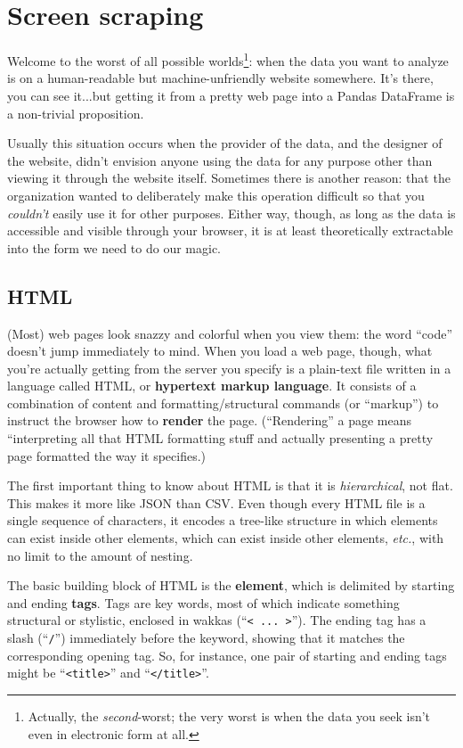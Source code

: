 
\chapter{Screen scraping}
\label{ch:screenScraping}

Welcome to the worst of all possible worlds\footnote{Actually, the
\textit{second}-worst; the very worst is when the data you seek isn't even in
electronic form at all.}: when the data you want to analyze is on a
human-readable but machine-unfriendly website somewhere. It's there, you can
see it...but getting it from a pretty web page into a Pandas DataFrame is a
non-trivial proposition.

Usually this situation occurs when the provider of the data, and the designer
of the website, didn't envision anyone using the data for any purpose other
than viewing it through the website itself. Sometimes there is another reason:
that the organization wanted to deliberately make this operation difficult so
that you \textit{couldn't} easily use it for other purposes. Either way,
though, as long as the data is accessible and visible through your browser, it
is at least theoretically extractable into the form we need to do our magic.

\section{HTML}

(Most) web pages look snazzy and colorful when you view them: the word
``code''
doesn't jump immediately to mind. When you load a web page, though, what
you're actually getting from the server you specify is a plain-text file
written in a language called HTML, or \textbf{hypertext markup language}. It
consists of a combination of content and formatting/structural commands (or
``markup'') to instruct the browser how to \textbf{render} the page.
(``Rendering'' a page means ``interpreting all that HTML formatting stuff and
actually presenting a pretty page formatted the way it specifies.)

The first important thing to know about HTML is that it is
\textit{hierarchical}, not flat. This makes it more like JSON than CSV. Even
though every HTML file is a single sequence of characters, it encodes a
tree-like structure in which elements can exist inside other elements, which
can exist inside other elements, \textit{etc.}, with no limit to the amount of
nesting.

The basic building block of HTML is the \textbf{element}, which is delimited
by starting and ending \textbf{tags}. Tags are key words, most of which
indicate something structural or stylistic, enclosed in wakkas (``\texttt{<
... >}''). The ending tag has a slash (``\texttt{/}'') immediately before the
keyword, showing that it matches the corresponding opening tag. So, for
instance, one pair of starting and ending tags might be ``\texttt{<title>}''
and ``\texttt{</title>}''.

